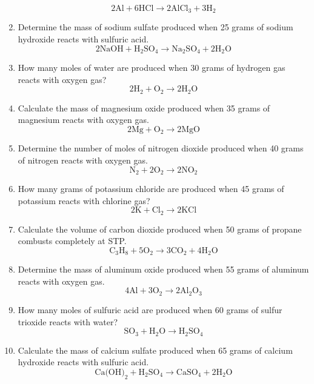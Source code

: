 \documentclass{article}
\begin{document}
\begin{enumerate}
\[
2\text{Al} + 6\text{HCl} \rightarrow 2\text{AlCl}_3 + 3\text{H}_2
\]
\item Determine the mass of sodium sulfate produced when 25 grams of sodium hydroxide reacts with sulfuric acid.
\[
2\text{NaOH} + \text{H}_2\text{SO}_4 \rightarrow \text{Na}_2\text{SO}_4 + 2\text{H}_2\text{O}
\]
\item How many moles of water are produced when 30 grams of hydrogen gas reacts with oxygen gas?
\[
2\text{H}_2 + \text{O}_2 \rightarrow 2\text{H}_2\text{O}
\]
\item Calculate the mass of magnesium oxide produced when 35 grams of magnesium reacts with oxygen gas.
\[
2\text{Mg} + \text{O}_2 \rightarrow 2\text{MgO}
\]
\item Determine the number of moles of nitrogen dioxide produced when 40 grams of nitrogen reacts with oxygen gas.
\[
\text{N}_2 + 2\text{O}_2 \rightarrow 2\text{NO}_2
\]
\item How many grams of potassium chloride are produced when 45 grams of potassium reacts with chlorine gas?
\[
2\text{K} + \text{Cl}_2 \rightarrow 2\text{KCl}
\]
\item Calculate the volume of carbon dioxide produced when 50 grams of propane combusts completely at STP.
\[
\text{C}_3\text{H}_8 + 5\text{O}_2 \rightarrow 3\text{CO}_2 + 4\text{H}_2\text{O}
\]
\item Determine the mass of aluminum oxide produced when 55 grams of aluminum reacts with oxygen gas.
\[
4\text{Al} + 3\text{O}_2 \rightarrow 2\text{Al}_2\text{O}_3
\]
\item How many moles of sulfuric acid are produced when 60 grams of sulfur trioxide reacts with water?
\[
\text{SO}_3 + \text{H}_2\text{O} \rightarrow \text{H}_2\text{SO}_4
\]
\item Calculate the mass of calcium sulfate produced when 65 grams of calcium hydroxide reacts with sulfuric acid.
\[
\text{Ca(OH)}_2 + \text{H}_2\text{SO}_4 \rightarrow \text{CaSO}_4 + 2\text{H}_2\text{O}
\]
\end{enumerate}
\end{document}
